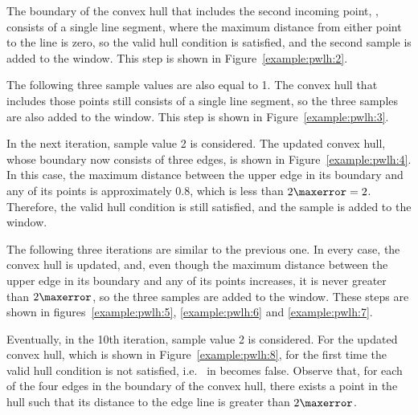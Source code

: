 

\newcommand{\widthh}{\textit{distance}}
The boundary of the convex hull that includes the second incoming point, , consists of a single line segment, where the maximum distance from either point to the line is zero, so the valid hull condition is satisfied, and the second sample is added to the window. This step is shown in Figure~\ref{example:pwlh:2}.




\clearpage


The following three sample values are also equal to 1. The convex hull that includes those points still consists of a single line segment, so the three samples are also added to the window. This step is shown in Figure~\ref{example:pwlh:3}.




In the next iteration, sample value 2 is considered. The updated convex hull, whose boundary now consists of three edges, is shown in Figure~\ref{example:pwlh:4}. In this case, the maximum distance between the upper edge in its boundary and any of its points is approximately $0.8$, which is less than $2\maxerror=2$. Therefore, the valid hull condition is still satisfied, and the sample is added to the window.




\clearpage


The following three iterations are similar to the previous one. In every case, the convex hull is updated, and, even though the maximum distance between the upper edge in its boundary and any of its points increases, it is never greater than $2\maxerror$, so the three samples are added to the window. These steps are shown in figures~\ref{example:pwlh:5}, \ref{example:pwlh:6} and \ref{example:pwlh:7}. 




\clearpage




Eventually, in the 10th iteration, sample value 2 is considered. For the updated convex hull, which is shown in Figure~\ref{example:pwlh:8}, for the first time the valid hull condition is not satisfied, i.e. \validHull\ in  becomes false. Observe that, for each of the four edges in the boundary of the convex hull, there exists a point in the hull such that its distance to the edge line is greater than $2\maxerror$. 


